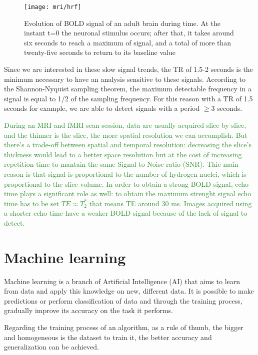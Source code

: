 \documentclass[11pt]{report}
\begin{document}
\begin{figure}[h]
\centering
\texttt{[image: mri/hrf]}
\caption{Evolution of BOLD signal of an adult brain during time. At the instant t=0 the neuronal stimulus occurs; after that, it takes around six seconds to reach a maximum of signal, and a total of more than twenty-five seconds to return to its baseline value}
\label{fig:hrf}
\end{figure}


Since we are interested in these slow signal trends, the TR of 1.5-2 seconds is the minimum necessary to have an analysis sensitive to these signals.
According to the Shannon-Nyquist sampling theorem, the maximum detectable frequency in a signal is equal to 1/2 of the sampling frequency.
For this reason with a TR of 1.5 seconds for example, we are able to detect signals with a period $\geq 3$ seconds.

\textcolor{ForestGreen}{During an MRI and fMRI scan session, data are usually acquired slice by slice, and the thinner is the slice, the more spatial resolution we can accomplish.
But there's a trade-off between spatial and temporal resolution: decreasing the slice's thickness would lead to a better space resolution but at the cost of increasing repetition time to mantain the same Signal to Noise ratio (SNR).
Thie main reason is that signal is proportional to the number of hydrogen nuclei, which is proportional to the slice volume.
In order to obtain a strong BOLD signal, echo time plays a significant role as well: to obtain the maximum strenght signal echo time has to be set $TE \approx T_2^{\ast}$ that means TE around 30 ms.
Images acquired using a shorter echo time have a weaker BOLD signal because of the lack of signal to detect. \cite{jenkinson2018}
}


\chapter{Machine learning}\label{chap:machine_learning}

Machine learning is a branch of Artificial Intelligence (AI) that aims to learn from data and apply this knowledge on new, different data.
It is possible to make predictions or perform classification of data and through the training process, gradually improve its accuracy on the task it performs.

Regarding the training process of an algorithm, as a rule of thumb, the bigger and homogeneous is the dataset to train it, the better accuracy and generalization can be achieved. %
\end{document}
